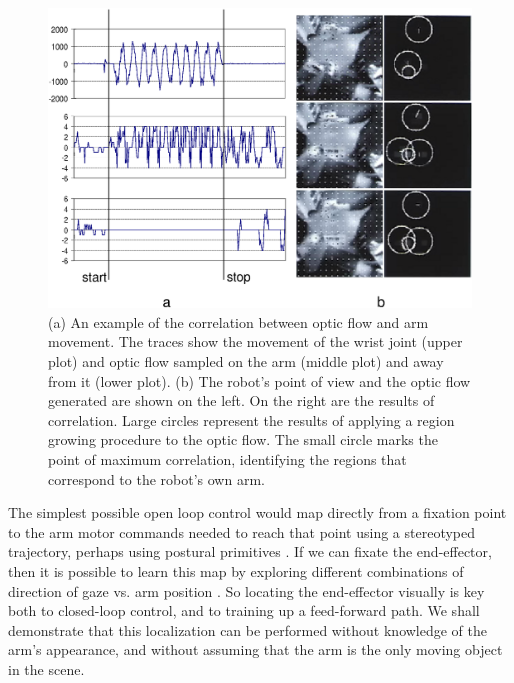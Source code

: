 \begin{figure}[tb]
\begin{center}
\includegraphics[width=12cm]{arm-detection-all.eps}
\caption{ 
%
(a) An example of the correlation between optic flow and arm movement.
The traces show the movement of the wrist joint (upper plot)
and optic flow sampled on the arm (middle plot) and away from it (lower
plot). (b) The robot's point of view and the optic flow generated are 
shown on the left. On the right are the results of correlation.  
Large circles represent the results of applying a region growing 
procedure to the optic flow. The small circle marks the point of maximum 
correlation, identifying the regions that correspond to the robot's own arm.
%
}
\label{fig:arm-detection}
\end{center}
\end{figure}


The simplest possible open loop control would map directly from a
fixation point to the arm motor commands needed to reach that point
\cite{metta99developmental} using a stereotyped trajectory, perhaps
using postural primitives \cite{mussa-ivaldi92vector}.  If we can
fixate the end-effector, then it is possible to learn this map by
exploring different combinations of direction of gaze vs.  arm
position \cite{Marjanovic-96-SAB,metta99developmental}.  So locating
the end-effector visually is key both to closed-loop control, and to
training up a feed-forward path.  We shall demonstrate that this
localization can be performed without knowledge of the arm's appearance,
and without assuming that the arm is the only moving object in the
scene.

